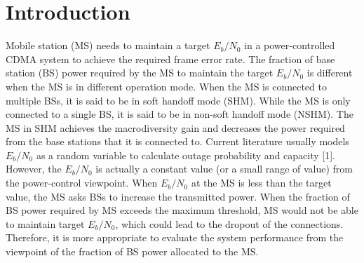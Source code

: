 \section{Introduction}
Mobile station (MS) needs to maintain a target $E_b/N_0$ in a
power-controlled CDMA system to achieve the required frame error
rate. The fraction of base station (BS) power required by the MS
to maintain the target $E_b/N_0$ is different when the MS is in
different operation mode. When the MS is connected to multiple
BSs, it is said to be in soft handoff mode (SHM). While the MS is
only connected to a single BS, it is said to be in non-soft
handoff mode (NSHM). The MS in SHM achieves the macrodiversity
gain and decreases the power required from the base stations that
it is connected to. Current literature usually models $E_b/N_0$ as
a random variable to calculate outage probability and capacity
[1]. However, the $E_b/N_0$ is actually a constant value (or a
small range of value) from the power-control viewpoint. When
$E_b/N_0$ at the MS is less than the target value, the MS asks BSs
to increase the transmitted power. When the fraction of BS power
required by MS exceeds the maximum threshold, MS would not be able
to maintain target $E_b/N_0$, which could lead to the dropout of
the connections. Therefore, it is more appropriate to evaluate the
system performance from the viewpoint of the fraction of BS power
allocated to the MS.

